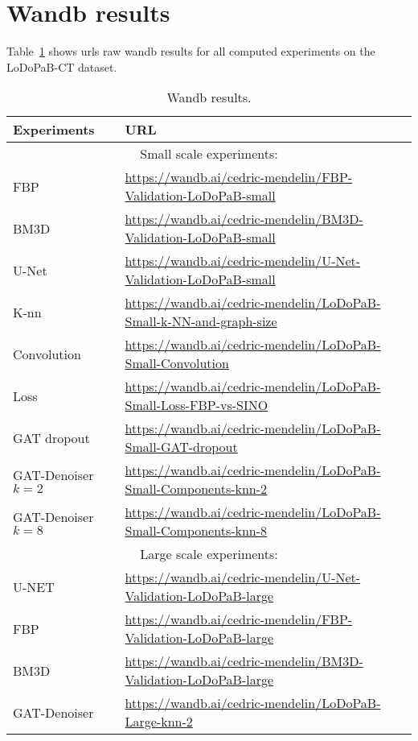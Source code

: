 \section{Wandb results}
Table~\ref{tab:wandb_results} shows urls raw wandb results for all computed experiments on the LoDoPaB-CT dataset.
\begin{table}[H]
  \centering
  \begin{tabular}{l|l}
    \toprule
    \textbf{Experiments} & \textbf{URL} \\ 
    \midrule
    \multicolumn{2}{c}{Small scale experiments:} \\
    FBP & \url{https://wandb.ai/cedric-mendelin/FBP-Validation-LoDoPaB-small} \\ \hline
    BM3D & \url{https://wandb.ai/cedric-mendelin/BM3D-Validation-LoDoPaB-small} \\ \hline
    U-Net& \url{https://wandb.ai/cedric-mendelin/U-Net-Validation-LoDoPaB-small} \\ \hline
    K-nn &\url{https://wandb.ai/cedric-mendelin/LoDoPaB-Small-k-NN-and-graph-size} \\ \hline
    Convolution & \url{https://wandb.ai/cedric-mendelin/LoDoPaB-Small-Convolution} \\ \hline
    Loss& \url{https://wandb.ai/cedric-mendelin/LoDoPaB-Small-Loss-FBP-vs-SINO} \\ \hline
    GAT dropout& \url{https://wandb.ai/cedric-mendelin/LoDoPaB-Small-GAT-dropout} \\ \hline
    GAT-Denoiser $k=2$ & \url{https://wandb.ai/cedric-mendelin/LoDoPaB-Small-Components-knn-2} \\ \hline
    GAT-Denoiser $k=8$ & \url{https://wandb.ai/cedric-mendelin/LoDoPaB-Small-Components-knn-8} \\ \hline
    \midrule
    \multicolumn{2}{c}{Large scale experiments:} \\
    U-NET & \url{https://wandb.ai/cedric-mendelin/U-Net-Validation-LoDoPaB-large} \\ \hline
    FBP& \url{https://wandb.ai/cedric-mendelin/FBP-Validation-LoDoPaB-large} \\ \hline
    BM3D& \url{https://wandb.ai/cedric-mendelin/BM3D-Validation-LoDoPaB-large} \\ \hline
    GAT-Denoiser & \url{https://wandb.ai/cedric-mendelin/LoDoPaB-Large-knn-2} \\ \hline

  \end{tabular}
  \caption{Wandb results.}
  \label{tab:wandb_results}
\end{table}

